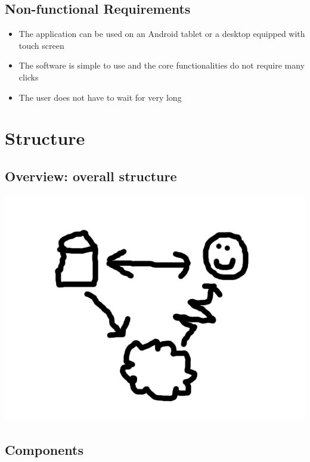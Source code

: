 \documentclass[11pt]{article}
\begin{document}
\subsection{Non-functional Requirements}

\begin{itemize}
\item{The application can be used on an Android tablet or a desktop equipped with touch screen}
\item{The software is simple to use and the core functionalities do not require many clicks}
\item{The user does not have to wait for very long}  
\end{itemize}

\section{Structure}

\subsection{Overview: overall structure}
\includegraphics[scale=0.5]{overall-structure.png}


\subsection{Components}
\end{document}
